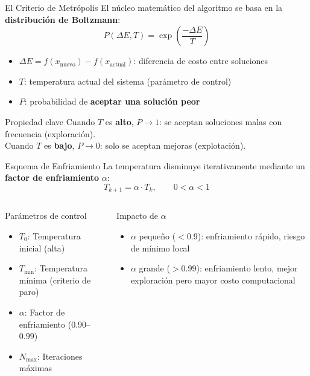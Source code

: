 \documentclass[aspectratio=169,xcolor=dvipsnames]{beamer}
\begin{document}
\begin{frame}{El Criterio de Metrópolis}
    El núcleo matemático del algoritmo se basa en la \textbf{distribución de Boltzmann}:
    \begin{equation}
        P(\Delta E, T) = \exp\!\left(\frac{-\Delta E}{T}\right)
    \end{equation}
    \begin{itemize}
        \item $\Delta E = f(x_{\text{nuevo}}) - f(x_{\text{actual}})$: diferencia de costo entre soluciones
        \item $T$: temperatura actual del sistema (parámetro de control)
        \item $P$: probabilidad de \textbf{aceptar una solución peor}
    \end{itemize}
    \vspace{0.2cm}
    \begin{alertblock}{Propiedad clave}
        Cuando $T$ es \textbf{alto}, $P \to 1$: se aceptan soluciones malas con frecuencia (exploración). \\
        Cuando $T$ es \textbf{bajo}, $P \to 0$: solo se aceptan mejoras (explotación).
    \end{alertblock}
\end{frame}

\begin{frame}{Esquema de Enfriamiento}
    La temperatura disminuye iterativamente mediante un \textbf{factor de enfriamiento} $\alpha$:
    \begin{equation}
        T_{k+1} = \alpha \cdot T_k, \qquad 0 < \alpha < 1
    \end{equation}
    \begin{columns}
        \begin{block}{Parámetros de control}
            \begin{itemize}
                \item $T_0$: Temperatura inicial (alta)
                \item $T_{\min}$: Temperatura mínima (criterio de paro)
                \item $\alpha$: Factor de enfriamiento ($0.90$--$0.99$)
                \item $N_{\max}$: Iteraciones máximas
            \end{itemize}
        \end{block}
        \begin{alertblock}{Impacto de $\alpha$}
            \begin{itemize}
                \item $\alpha$ pequeño ($< 0.9$): enfriamiento rápido, riesgo de mínimo local
                \item $\alpha$ grande ($> 0.99$): enfriamiento lento, mejor exploración pero mayor costo computacional
            \end{itemize}
        \end{alertblock}
    \end{columns}
\end{frame}
\end{document}
